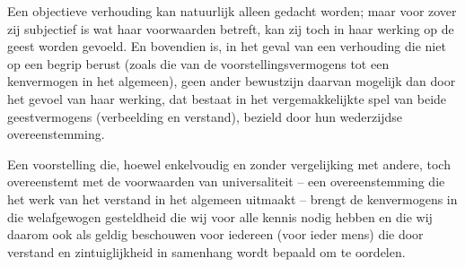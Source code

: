 Een objectieve verhouding kan natuurlijk alleen gedacht worden; maar voor zover zij subjectief is wat haar voorwaarden betreft, kan zij toch in haar werking op de geest worden gevoeld. En bovendien is, in het geval van een verhouding die niet op een begrip berust (zoals die van de voorstellingsvermogens tot een kenvermogen in het algemeen), geen ander bewustzijn daarvan mogelijk dan door het gevoel van haar werking, dat bestaat in het vergemakkelijkte spel van beide geestvermogens (verbeelding en verstand), bezield door hun wederzijdse overeenstemming.

Een voorstelling die, hoewel enkelvoudig en zonder vergelijking met andere, toch overeenstemt met de voorwaarden van universaliteit – een overeenstemming die het werk van het verstand in het algemeen uitmaakt – brengt de kenvermogens in die welafgewogen gesteldheid die wij voor alle kennis nodig hebben en die wij daarom ook als geldig beschouwen voor iedereen (voor ieder mens) die door verstand en zintuiglijkheid in samenhang wordt bepaald om te oordelen.

